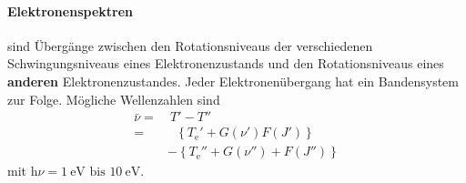 	\begin{minipage}{0.5\linewidth}
		\paragraph{Elektronenspektren} sind Übergänge zwischen den Rotationsniveaus der verschiedenen Schwingungsniveaus eines Elektronenzustands und den Rotationsniveaus eines \textbf{anderen} Elektronenzustandes. 
		Jeder Elektronenübergang hat ein Bandensystem zur Folge.
		Mögliche Wellenzahlen sind
		\begin{align}
			\label{eq:4.14}
			\bar{ \nu} =&~T' - T'' \nonumber\\
			=& ~~~\left\{ T_{\mathrm{e}}' + G( \nu') F(J') \right\} \nonumber\\
			&- \left\{ T_{\mathrm{e}}'' + G( \nu'') + F(J '') \right\} 
		\end{align} 
		mit $ \mathrm{h} \nu = \SI{1}{\electronvolt}\text{ bis }\SI{10}{\electronvolt}$.
	\end{minipage}
	\hspace{1cm}
